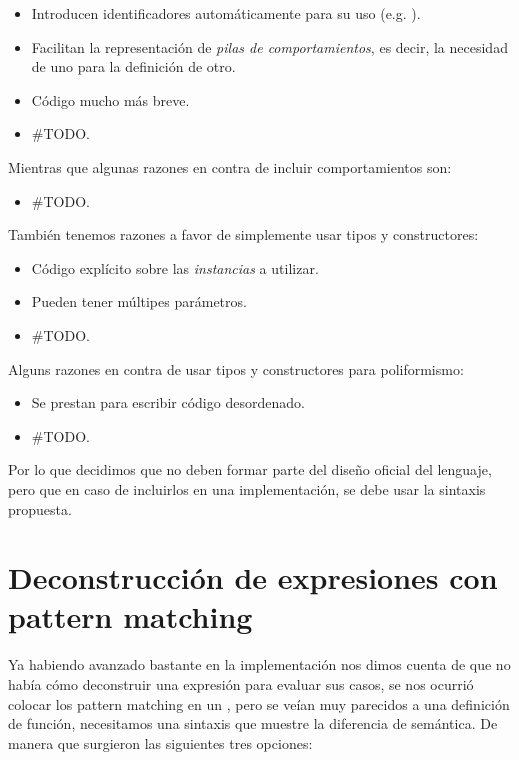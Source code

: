 {\begin{designfr}
\begin{itemize}
    \item Introducen identificadores automáticamente para su uso (e.g. ).
    \item Facilitan la representación de \emph{pilas de comportamientos}, es decir, la necesidad de uno para la definición de otro.
    \item Código mucho más breve.
    \item \#TODO.
\end{itemize}

Mientras que algunas razones en contra de incluir comportamientos son:

\begin{itemize}
    \item \#TODO.
\end{itemize}

También tenemos razones a favor de simplemente usar tipos y constructores:

\begin{itemize}
    \item Código explícito sobre las \emph{instancias} a utilizar.
    \item Pueden tener múltipes parámetros.
    \item \#TODO.
\end{itemize}

Alguns razones en contra de usar tipos y constructores para poliformismo:

\begin{itemize}
    \item Se prestan para escribir código desordenado.
    \item \#TODO.
\end{itemize}

Por lo que decidimos que no deben formar parte del diseño oficial del lenguaje, pero que en caso de incluirlos en una implementación, se debe usar la sintaxis propuesta.
\end{designfr}

\section{Deconstrucción de expresiones con pattern matching}

\begin{designfr}
Ya habiendo avanzado bastante en la implementación nos dimos cuenta de que no había cómo deconstruir una expresión para evaluar sus casos, se nos ocurrió colocar los pattern matching en un , pero se veían muy parecidos a una definición de función, necesitamos una sintaxis que muestre la diferencia de semántica. De manera que surgieron las siguientes tres opciones:


\end{designfr}}
